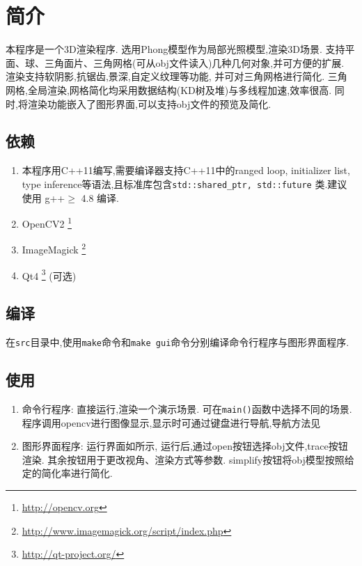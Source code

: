 
\section{简介}
本程序是一个3D渲染程序.
选用Phong模型\cite{phong}作为局部光照模型,渲染3D场景. 支持平面、球、三角面片、三角网格(可从obj文件读入)几种几何对象,并可方便的扩展.
渲染支持软阴影,抗锯齿,景深,自定义纹理等功能, 并可对三角网格进行简化.
三角网格,全局渲染,网格简化均采用数据结构(KD树及堆)与多线程加速,效率很高.
同时,将渲染功能嵌入了图形界面,可以支持obj文件的预览及简化.

\subsection{依赖}
\begin{enumerate}
  \item 本程序用C++11编写,需要编译器支持C++11中的ranged loop, initializer list, type inference等语法,且标准库包含\verb|std::shared_ptr, std::future|
    类.建议使用 g++$ \ge$ 4.8 编译.

  \item OpenCV2 \footnote{\url{http://opencv.org}}

  \item ImageMagick \footnote{\url{http://www.imagemagick.org/script/index.php}}

\item Qt4  \footnote{\url{http://qt-project.org/}} (可选)
\end{enumerate}


\subsection{编译}
在\verb|src|目录中,使用\verb|make|命令和\verb|make gui|命令分别编译命令行程序与图形界面程序.

\subsection{使用}

\begin{enumerate}
    \item 命令行程序:
      直接运行,渲染一个演示场景. 可在\verb|main()|函数中选择不同的场景.
      程序调用opencv进行图像显示,显示时可通过键盘进行导航,导航方法见

      \item 图形界面程序:
        运行界面如所示,
        运行后,通过open按钮选择obj文件,trace按钮渲染. 其余按钮用于更改视角、渲染方式等参数.
        simplify按钮将obj模型按照给定的简化率进行简化.
\end{enumerate}

